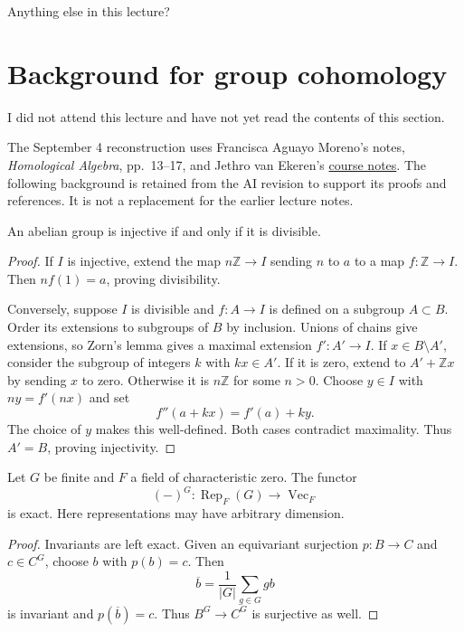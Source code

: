 \noindent
Anything else in this lecture?


\section{Background for group cohomology}
\label{section-ai-background-sept-four}

\noindent
I did not attend this lecture and have not yet read the contents of this section.

\medskip\noindent
The September 4 reconstruction uses
Francisca Aguayo Moreno's notes,
\emph{Homological Algebra}, pp.~13--17,
and Jethro van Ekeren's
\href{https://w3.impa.br/~jethro/2026-2/%
ah-current.pdf}{course notes}.
The following background is retained
from the AI revision to support its
proofs and references. It is not a
replacement for the earlier lecture
notes.

\begin{proposition}
\label{proposition-divisible-injective}
An abelian group is injective if and only
if it is divisible.
\end{proposition}

\begin{proof}
If $I$ is injective, extend the map
$n\mathbb{Z}\to I$ sending $n$ to $a$
to a map $f:\mathbb{Z}\to I$. Then
$nf(1)=a$, proving divisibility.

Conversely, suppose $I$ is divisible and
$f:A\to I$ is defined on a subgroup
$A\subset B$. Order its extensions to
subgroups of $B$ by inclusion. Unions of
chains give extensions, so Zorn's lemma
gives a maximal extension $f':A'\to I$.
If $x\in B\setminus A'$, consider the
subgroup of integers $k$ with $kx\in A'$.
If it is zero, extend to $A'+\mathbb{Z}x$
by sending $x$ to zero. Otherwise it is
$n\mathbb{Z}$ for some $n>0$.
Choose $y\in I$ with $ny=f'(nx)$ and set
$$
f''(a+kx)=f'(a)+ky.
$$
The choice of $y$ makes this well-defined.
Both cases contradict maximality. Thus
$A'=B$, proving injectivity.
\end{proof}

\begin{proposition}[Averaging]
\label{proposition-invariants-averaging}
Let $G$ be finite and $F$ a field of
characteristic zero. The functor
$$
(-)^G:\operatorname{Rep}_F(G)
\to\operatorname{Vec}_F
$$
is exact. Here representations may have
arbitrary dimension.
\end{proposition}

\begin{proof}
Invariants are left exact. Given an
equivariant surjection $p:B\to C$ and
$c\in C^G$, choose $b$ with $p(b)=c$.
Then
$$
\overline b=\frac{1}{|G|}\sum_{g\in G}gb
$$
is invariant and $p(\overline b)=c$.
Thus $B^G\to C^G$ is surjective as well.
\end{proof}


